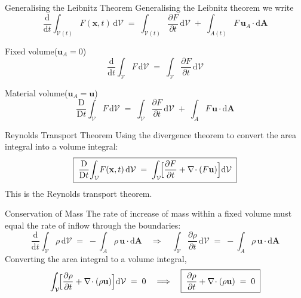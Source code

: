 \documentclass[10pt,aspectratio=43]{beamer}
\newcommand{\dd}{\mathrm{d}}
\newcommand{\D}{\mathrm{D}}
\newcommand{\pd}[2]{\frac{\partial #1}{\partial #2}}
\newcommand{\bu}{\mathbf{u}}
\newcommand{\bx}{\mathbf{x}}
\newcommand{\divg}{\nabla\!\cdot}
\newcommand{\Vol}{\mathcal{V}}
\begin{document}
\begin{frame}{Generalising the Leibnitz Theorem}
  Generalising the Leibnitz theorem we write
  \[
    \frac{\dd}{\dd t}\!\int_{\Vol(t)}\!F(\bx,t)\,\dd\Vol
      \;=\; \int_{\Vol(t)}\!\pd{F}{t}\,\dd\Vol
        \;+\; \int_{A(t)}\!F\,\bu_{A}\!\cdot\!\dd\mathbf{A}
  \]
  \begin{block}{Fixed volume\;\;($\bu_{A}=0$)}
    \[
      \frac{\dd}{\dd t}\!\int_{\Vol}\!F\,\dd\Vol
        \;=\; \int_{\Vol}\!\pd{F}{t}\,\dd\Vol
    \]
  \end{block}
  \begin{block}{Material volume\;\;($\bu_{A}=\bu$)}
    \[
      \frac{\D}{\D t}\!\int_{\Vol}\!F\,\dd\Vol
        \;=\; \int_{\Vol}\!\pd{F}{t}\,\dd\Vol
        \;+\; \int_{A}\!F\,\bu\!\cdot\!\dd\mathbf{A}
    \]
  \end{block}
\end{frame}

\begin{frame}{Reynolds Transport Theorem}
  Using the divergence theorem to convert the area integral into a volume
  integral:
  \[
    \boxed{\;\frac{\D}{\D t}\!\int_{\Vol}\!F(\bx,t)\,\dd\Vol
        \;=\; \int_{\Vol}\!\Bigl[\pd{F}{t} + \divg(F\bu)\Bigr]\dd\Vol\;}
  \]
  This is the \alert{Reynolds transport theorem}.
\end{frame}

\begin{frame}{Conservation of Mass}
  The rate of increase of mass within a fixed volume must equal the rate of
  inflow through the boundaries:
  \[
    \frac{\dd}{\dd t}\!\int_{\Vol}\!\rho\,\dd\Vol
      \;=\; -\int_{A}\!\rho\,\bu\!\cdot\!\dd\mathbf{A}
    \quad\Longrightarrow\quad
    \int_{\Vol}\!\pd{\rho}{t}\,\dd\Vol \;=\; -\int_{A}\!\rho\,\bu\!\cdot\!\dd\mathbf{A}
  \]
  Converting the area integral to a volume integral,
  \[
    \int_{\Vol}\!\Bigl[\pd{\rho}{t} + \divg(\rho\bu)\Bigr]\dd\Vol \;=\; 0
    \quad\Longrightarrow\quad
    \boxed{\;\pd{\rho}{t} + \divg(\rho\bu) \;=\; 0\;}
  \]
\end{frame}
\end{document}
